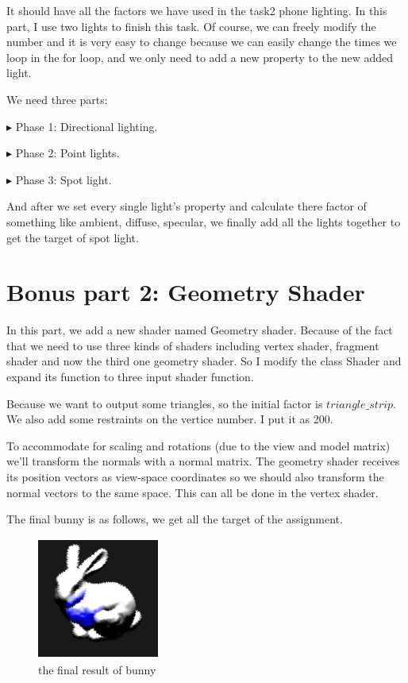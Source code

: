 \documentclass[acmtog]{acmart}
\begin{document}
It should have all the factors we have used in the task2 phone lighting. In this part, I use two lights to finish this task. Of course, we can freely modify the number and it is very easy to change because we can easily change the  times we loop in the for loop, and we only need to add a new property to the new added light.

We need three parts:

$\blacktriangleright$ Phase 1: Directional lighting.

$\blacktriangleright$ Phase 2: Point lights.

$\blacktriangleright$ Phase 3: Spot light.

And after we set every single light's property and calculate there factor of something like ambient, diffuse, specular, we finally add all the lights together to get the target of spot light.

\section{Bonus part 2: Geometry Shader}

In this part, we add a new shader named Geometry shader. Because of the fact that we need to use three kinds of shaders including vertex shader, fragment shader and now the third one geometry shader. So I modify the class Shader and expand its function to three input shader function.

Because we want to output some triangles, so the initial factor is $triangle\_strip$. We also add some restraints on the vertice number. I put it as 200.

To accommodate for scaling and rotations (due to the view and model matrix) we'll transform the normals with a normal matrix. The geometry shader receives its position vectors as view-space coordinates so we should also transform the normal vectors to the same space. This can all be done in the vertex shader.

The final bunny is as follows, we get all the target of the assignment.

\begin{figure}[h]
\includegraphics[width=4cm,height=4cm]{final_bunny}
\caption{the final result of bunny}
\end{figure}
\end{document}
